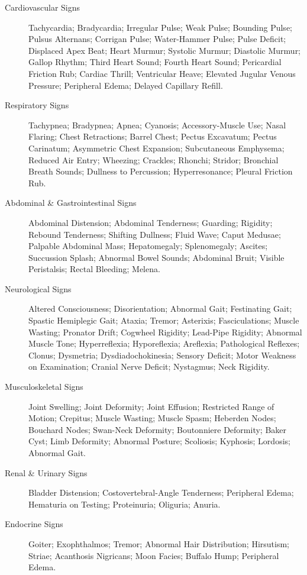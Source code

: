 \begin{description}
\item[Cardiovascular Signs] Tachycardia; Bradycardia; Irregular Pulse; Weak Pulse; Bounding Pulse; Pulsus Alternans; Corrigan Pulse; Water-Hammer Pulse; Pulse Deficit; Displaced Apex Beat; Heart Murmur; Systolic Murmur; Diastolic Murmur; Gallop Rhythm; Third Heart Sound; Fourth Heart Sound; Pericardial Friction Rub; Cardiac Thrill; Ventricular Heave; Elevated Jugular Venous Pressure; Peripheral Edema; Delayed Capillary Refill.

\item[Respiratory Signs] Tachypnea; Bradypnea; Apnea; Cyanosis; Accessory-Muscle Use; Nasal Flaring; Chest Retractions; Barrel Chest; Pectus Excavatum; Pectus Carinatum; Asymmetric Chest Expansion; Subcutaneous Emphysema; Reduced Air Entry; Wheezing; Crackles; Rhonchi; Stridor; Bronchial Breath Sounds; Dullness to Percussion; Hyperresonance; Pleural Friction Rub.

\item[Abdominal \& Gastrointestinal Signs] Abdominal Distension; Abdominal Tenderness; Guarding; Rigidity; Rebound Tenderness; Shifting Dullness; Fluid Wave; Caput Medusae; Palpable Abdominal Mass; Hepatomegaly; Splenomegaly; Ascites; Succussion Splash; Abnormal Bowel Sounds; Abdominal Bruit; Visible Peristalsis; Rectal Bleeding; Melena.

\item[Neurological Signs] Altered Consciousness; Disorientation; Abnormal Gait; Festinating Gait; Spastic Hemiplegic Gait; Ataxia; Tremor; Asterixis; Fasciculations; Muscle Wasting; Pronator Drift; Cogwheel Rigidity; Lead-Pipe Rigidity; Abnormal Muscle Tone; Hyperreflexia; Hyporeflexia; Areflexia; Pathological Reflexes; Clonus; Dysmetria; Dysdiadochokinesia; Sensory Deficit; Motor Weakness on Examination; Cranial Nerve Deficit; Nystagmus; Neck Rigidity.

\item[Musculoskeletal Signs] Joint Swelling; Joint Deformity; Joint Effusion; Restricted Range of Motion; Crepitus; Muscle Wasting; Muscle Spasm; Heberden Nodes; Bouchard Nodes; Swan-Neck Deformity; Boutonniere Deformity; Baker Cyst; Limb Deformity; Abnormal Posture; Scoliosis; Kyphosis; Lordosis; Abnormal Gait.

\item[Renal \& Urinary Signs] Bladder Distension; Costovertebral-Angle Tenderness; Peripheral Edema; Hematuria on Testing; Proteinuria; Oliguria; Anuria.

\item[Endocrine Signs] Goiter; Exophthalmos; Tremor; Abnormal Hair Distribution; Hirsutism; Striae; Acanthosis Nigricans; Moon Facies; Buffalo Hump; Peripheral Edema.


\end{description}
